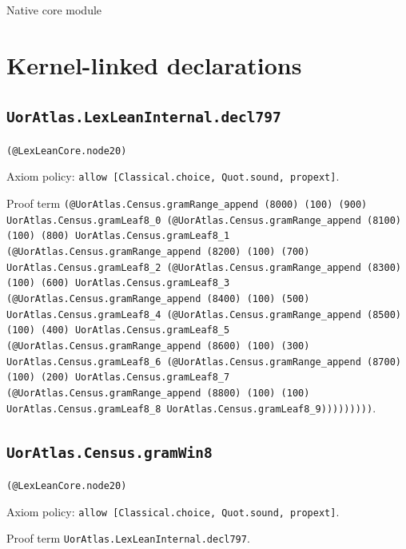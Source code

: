 \documentclass[11pt]{article}
\begin{document}
\begin{center}{\LARGE Native core module}\end{center}
\section*{Kernel-linked declarations}
\subsection*{\texttt{UorAtlas.LexLeanInternal.decl797}}
\noindent\texttt{(@LexLeanCore.node20)}\par
\noindent Axiom policy: \texttt{allow [Classical.choice, Quot.sound, propext]}.\par
\noindent Proof term \texttt{(@UorAtlas.Census.gramRange\_append (8000) (100) (900) UorAtlas.Census.gramLeaf8\_0 (@UorAtlas.Census.gramRange\_append (8100) (100) (800) UorAtlas.Census.gramLeaf8\_1 (@UorAtlas.Census.gramRange\_append (8200) (100) (700) UorAtlas.Census.gramLeaf8\_2 (@UorAtlas.Census.gramRange\_append (8300) (100) (600) UorAtlas.Census.gramLeaf8\_3 (@UorAtlas.Census.gramRange\_append (8400) (100) (500) UorAtlas.Census.gramLeaf8\_4 (@UorAtlas.Census.gramRange\_append (8500) (100) (400) UorAtlas.Census.gramLeaf8\_5 (@UorAtlas.Census.gramRange\_append (8600) (100) (300) UorAtlas.Census.gramLeaf8\_6 (@UorAtlas.Census.gramRange\_append (8700) (100) (200) UorAtlas.Census.gramLeaf8\_7 (@UorAtlas.Census.gramRange\_append (8800) (100) (100) UorAtlas.Census.gramLeaf8\_8 UorAtlas.Census.gramLeaf8\_9)))))))))}.\par
\subsection*{\texttt{UorAtlas.Census.gramWin8}}
\noindent\texttt{(@LexLeanCore.node20)}\par
\noindent Axiom policy: \texttt{allow [Classical.choice, Quot.sound, propext]}.\par
\noindent Proof term \texttt{UorAtlas.LexLeanInternal.decl797}.\par
\end{document}
